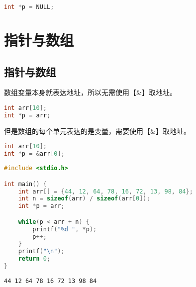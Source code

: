 \vspace{-0.5cm}

\begin{lstlisting}[language=C]
int *p = NULL;
\end{lstlisting}

\newpage

\section{指针与数组}

\subsection{指针与数组}

数组变量本身就表达地址，所以无需使用【\&】取地址。

\vspace{-0.5cm}

\begin{lstlisting}[language=C]
int arr[10];
int *p = arr;
\end{lstlisting}

但是数组的每个单元表达的是变量，需要使用【\&】取地址。

\vspace{-0.5cm}

\begin{lstlisting}[language=C]
int arr[10];
int *p = &arr[0];
\end{lstlisting}

\vspace{0.5cm}


\begin{lstlisting}[language=C]
#include <stdio.h>

int main() {
    int arr[] = {44, 12, 64, 78, 16, 72, 13, 98, 84};
    int n = sizeof(arr) / sizeof(arr[0]);
    int *p = arr;

    while(p < arr + n) {
        printf("%d ", *p);
        p++;
    }
    printf("\n");
    return 0;
}
\end{lstlisting}

\begin{tcolorbox}
    \begin{verbatim}
44 12 64 78 16 72 13 98 84
	\end{verbatim}
\end{tcolorbox}

\vspace{0.5cm}

